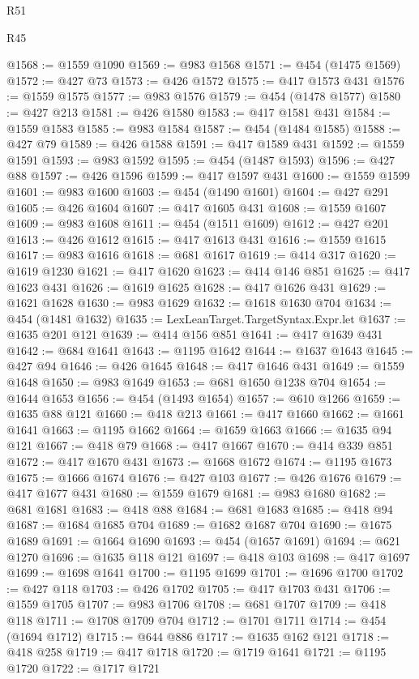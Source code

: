 \begin{lexlean}{R51}
\begin{lexlean}{R45}
\begin{coremodule}
{{{{{{{{{{{{{{{{{{{{{{{{{{{{{{{{{{{{{{{{{{{{{{{{{{{{{{{{{{{{{{{{{{{{{{{{{{{{{{{{{{{{{{{{{{{@1568 := @1559 @1090
@1569 := @983 @1568
@1571 := @454 (@1475 @1569)
@1572 := @427 @73
@1573 := @426 @1572
@1575 := @417 @1573 @431
@1576 := @1559 @1575
@1577 := @983 @1576
@1579 := @454 (@1478 @1577)
@1580 := @427 @213
@1581 := @426 @1580
@1583 := @417 @1581 @431
@1584 := @1559 @1583
@1585 := @983 @1584
@1587 := @454 (@1484 @1585)
@1588 := @427 @79
@1589 := @426 @1588
@1591 := @417 @1589 @431
@1592 := @1559 @1591
@1593 := @983 @1592
@1595 := @454 (@1487 @1593)
@1596 := @427 @88
@1597 := @426 @1596
@1599 := @417 @1597 @431
@1600 := @1559 @1599
@1601 := @983 @1600
@1603 := @454 (@1490 @1601)
@1604 := @427 @291
@1605 := @426 @1604
@1607 := @417 @1605 @431
@1608 := @1559 @1607
@1609 := @983 @1608
@1611 := @454 (@1511 @1609)
@1612 := @427 @201
@1613 := @426 @1612
@1615 := @417 @1613 @431
@1616 := @1559 @1615
@1617 := @983 @1616
@1618 := @681 @1617
@1619 := @414 @317
@1620 := @1619 @1230
@1621 := @417 @1620
@1623 := @414 @146 @851
@1625 := @417 @1623 @431
@1626 := @1619 @1625
@1628 := @417 @1626 @431
@1629 := @1621 @1628
@1630 := @983 @1629
@1632 := @1618 @1630 @704
@1634 := @454 (@1481 @1632)
@1635 := LexLeanTarget.TargetSyntax.Expr.let
@1637 := @1635 @201 @121
@1639 := @414 @156 @851
@1641 := @417 @1639 @431
@1642 := @684 @1641
@1643 := @1195 @1642
@1644 := @1637 @1643
@1645 := @427 @94
@1646 := @426 @1645
@1648 := @417 @1646 @431
@1649 := @1559 @1648
@1650 := @983 @1649
@1653 := @681 @1650 @1238 @704
@1654 := @1644 @1653
@1656 := @454 (@1493 @1654)
@1657 := @610 @1266
@1659 := @1635 @88 @121
@1660 := @418 @213
@1661 := @417 @1660
@1662 := @1661 @1641
@1663 := @1195 @1662
@1664 := @1659 @1663
@1666 := @1635 @94 @121
@1667 := @418 @79
@1668 := @417 @1667
@1670 := @414 @339 @851
@1672 := @417 @1670 @431
@1673 := @1668 @1672
@1674 := @1195 @1673
@1675 := @1666 @1674
@1676 := @427 @103
@1677 := @426 @1676
@1679 := @417 @1677 @431
@1680 := @1559 @1679
@1681 := @983 @1680
@1682 := @681 @1681
@1683 := @418 @88
@1684 := @681 @1683
@1685 := @418 @94
@1687 := @1684 @1685 @704
@1689 := @1682 @1687 @704
@1690 := @1675 @1689
@1691 := @1664 @1690
@1693 := @454 (@1657 @1691)
@1694 := @621 @1270
@1696 := @1635 @118 @121
@1697 := @418 @103
@1698 := @417 @1697
@1699 := @1698 @1641
@1700 := @1195 @1699
@1701 := @1696 @1700
@1702 := @427 @118
@1703 := @426 @1702
@1705 := @417 @1703 @431
@1706 := @1559 @1705
@1707 := @983 @1706
@1708 := @681 @1707
@1709 := @418 @118
@1711 := @1708 @1709 @704
@1712 := @1701 @1711
@1714 := @454 (@1694 @1712)
@1715 := @644 @886
@1717 := @1635 @162 @121
@1718 := @418 @258
@1719 := @417 @1718
@1720 := @1719 @1641
@1721 := @1195 @1720
@1722 := @1717 @1721
}}}}}}}}}}}}}}}}}}}}}}}}}}}}}}}}}}}}}}}}}}}}}}}}}}}}}}}}}}}}}}}}}}}}}}}}}}}}}}}}}}}}}}}}}}}
\end{coremodule}
\end{lexlean}
\end{lexlean}
